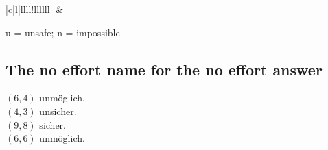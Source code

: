 \documentclass[a4paper, 11pt]{article}
\begin{document}
\begin{table}[h!]
{\begin{tabular}{|c|l|llll!{\color[rgb]{0,0.902,0}\vrule}llllll|}
      \hline
                        &                                                                                                                                                                                                                                                                                                                                                                                                                                                      \\
      \hline
      \end{tabular}}
      \end{table}
      u = unsafe; n = impossible

      \subsection{The no effort name for the no effort answer}
        $(6,4)$     unmöglich.\\
        $(4,3)$     unsicher. \\
        $(9,8)$     sicher. \\
        $(6,6)$     unmöglich.
        \newpage
    
\end{document}
